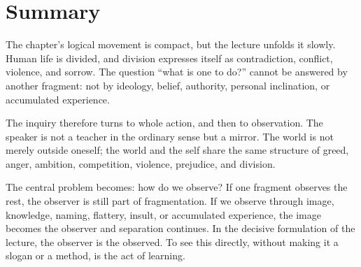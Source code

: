 \section{Summary}

The chapter's logical movement is compact, but the lecture unfolds it slowly. Human life is divided, and division expresses itself as contradiction, conflict, violence, and sorrow. The question ``what is one to do?'' cannot be answered by another fragment: not by ideology, belief, authority, personal inclination, or accumulated experience.

The inquiry therefore turns to whole action, and then to observation. The speaker is not a teacher in the ordinary sense but a mirror. The world is not merely outside oneself; the world and the self share the same structure of greed, anger, ambition, competition, violence, prejudice, and division.

The central problem becomes: how do we observe? If one fragment observes the rest, the observer is still part of fragmentation. If we observe through image, knowledge, naming, flattery, insult, or accumulated experience, the image becomes the observer and separation continues. In the decisive formulation of the lecture, the observer is the observed. To see this directly, without making it a slogan or a method, is the act of learning.